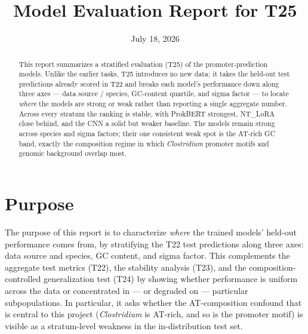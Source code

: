 \documentclass{article}
\title{Model Evaluation Report for T25}
\date{July 18, 2026}
\author{}
\begin{document}
\maketitle

\begin{abstract}
This report summarizes a stratified evaluation (T25) of the promoter-prediction models. Unlike the earlier tasks, T25 introduces no new data: it takes the held-out test predictions already scored in T22 and breaks each model's performance down along three axes --- data source / species, GC-content quartile, and sigma factor --- to locate \emph{where} the models are strong or weak rather than reporting a single aggregate number. Across every stratum the ranking is stable, with ProkBERT strongest, NT\_LoRA close behind, and the CNN a solid but weaker baseline. The models remain strong across species and sigma factors; their one consistent weak spot is the AT-rich GC band, exactly the composition regime in which \emph{Clostridium} promoter motifs and genomic background overlap most.
\end{abstract}

\section{Purpose}
The purpose of this report is to characterize \emph{where} the trained models' held-out performance comes from, by stratifying the T22 test predictions along three axes: data source and species, GC content, and sigma factor. This complements the aggregate test metrics (T22), the stability analysis (T23), and the composition-controlled generalization test (T24) by showing whether performance is uniform across the data or concentrated in --- or degraded on --- particular subpopulations. In particular, it asks whether the AT-composition confound that is central to this project (\emph{Clostridium} is AT-rich, and so is the promoter motif) is visible as a stratum-level weakness in the in-distribution test set.
\end{document}
